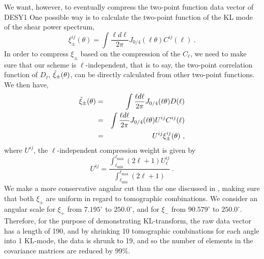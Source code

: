 \documentclass[twocolumn]{\docclass}
\newcommand\be{\begin{equation}}
\newcommand\ee{\end{equation}}
\def\bea{\begin{eqnarray}}
\def\eea{\end{eqnarray}}
\def\svs{\nonumber\\}
\begin{document}
	We want, however, to eventually compress the two-point function data vector of DESY1 One possible way is to calculate the two-point function of the KL mode of the shear power spectrum,
	\be
	\xi_{\pm}^{ij}(\theta) = \int \frac{\ell d \ell }{2\pi}J_{0/4}(\ell \theta) C^{ij}(\ell)\
	.\ee
	In order to compress $\xi_{\pm}$ based on the compression of the $C_{\ell}$, we need to make sure that our scheme is $\ell$-independent, that is to say, the two-point correlation function of $D_{\ell}$, $\Tilde{\xi}_{\pm}(\theta)$, can be directly calculated from other two-point functions. We then have,
	\bea
	\nonumber\Tilde{\xi}_{\pm}(\theta) &=& \int \frac{\ell d \ell }{2\pi}J_{0/4}(\ell \theta) D(\ell)\\\nonumber
	&=&\int \frac{\ell d \ell }{2\pi}J_{0/4}(\ell \theta) U^{ij}C^{ij}(\ell)\\
	&=&U^{ij}\xi_{\pm}^{ij}(\theta)\
	,\eea
	where $U^{ij}$, the $\ell$-independent compression weight is given by 
	\be
	U^{ij} = \frac{\int_{\ell _{\mathrm{min}}}^{\ell _{\mathrm{max}}} (2 \ell +1) U^{ij}_{\ell}}{\int_{\ell _{\mathrm{min}}}^{\ell _{\mathrm{max}}} (2 \ell +1)}\
	.\ee
	We make a more conservative angular cut than the one discussed in \cite{Troxel:2017xyo}, making sure that both $\xi_{\pm}$ are uniform in regard to tomographic combinations. We consider an angular scale for  $\xi_+$ from $7.195^{\circ}$ to $250.0^{\circ}$, and for $\xi_-$ from $90.579^{\circ}$ to $250.0^{\circ}$. Therefore, for the purpose of demonstrating KL-transform, the raw data vector has a length of 190, and by shrinking 10 tomographic combinations for each angle into 1 KL-mode, the data is shrunk to 19, and so the number of elements in the covariance matrices are reduced by 99\%.
	
	
\end{document}
